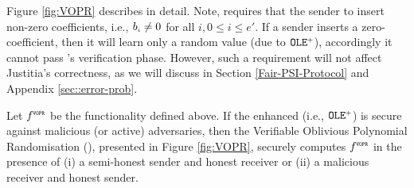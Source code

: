 Figure \ref{fig:VOPR} describes \vopr in detail. Note, \vopr requires that the sender to insert non-zero coefficients, i.e., $b_{\scriptscriptstyle i}\neq 0$ for all $i,0 \leq i \leq e'$. If a   sender inserts a zero-coefficient, then it will learn only a random value (due to  $\mathtt{OLE}^{\scriptscriptstyle +}$), accordingly it cannot pass \vopr's verification phase. However, such a requirement will not affect Justitia's correctness, as we will discuss in Section \ref{Fair-PSI-Protocol} and Appendix \ref{sec::error-prob}.  





\begin{theorem}\label{theorem::VOPR}
%
Let $f^{\scriptscriptstyle \mathtt{VOPR}}$ be the functionality defined above. If the enhanced \ole (i.e., $\mathtt{OLE}^{\scriptscriptstyle +}$) is secure against malicious (or active) adversaries, then the  Verifiable Oblivious Polynomial Randomisation (\vopr), presented in Figure \ref{fig:VOPR}, securely computes $f^{\scriptscriptstyle \mathtt{VOPR}}$ in the presence of (i) a semi-honest sender and honest receiver or (ii) a malicious receiver and honest sender. 
%
\end{theorem}






%

